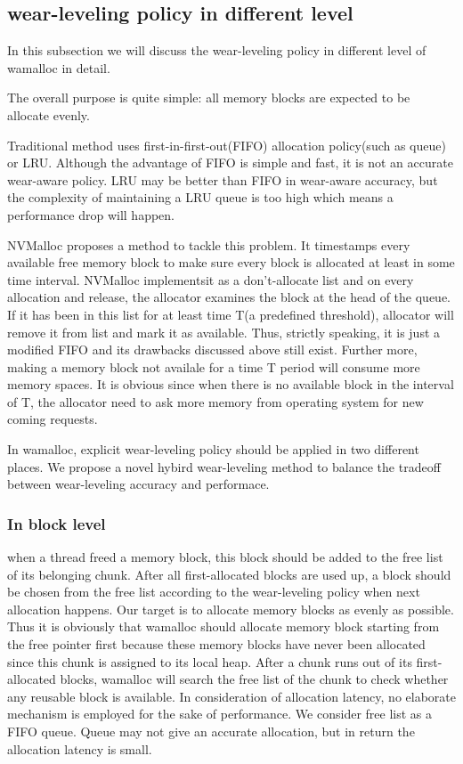 \documentclass{vldb}
\begin{document}
\subsection{wear-leveling policy in different level}

In this subsection we will discuss the wear-leveling policy in different level of wamalloc in detail.

The overall purpose is quite simple: all memory blocks are expected to be allocate evenly.

Traditional method uses first-in-first-out(FIFO) allocation policy(such as queue) or LRU\cite{zhou2009durable}\cite{rodriguez2015write}.
Although the advantage of FIFO is simple and fast, it is not an accurate wear-aware policy.
LRU may be better than FIFO in wear-aware accuracy, but the complexity of maintaining a LRU queue is too high which means a performance drop will happen.

NVMalloc\cite{moraru2013consistent} proposes a method to tackle this problem.
It timestamps every available free memory block to make sure every block is allocated at least in some time interval. NVMalloc implementsit as a don't-allocate list and on every allocation and release, the allocator examines the block at the head of the queue.
If it has been in this list for at least time T(a predefined threshold), allocator will remove it from list and mark it as available.
Thus, strictly speaking, it is just a modified FIFO and its drawbacks discussed above still exist.
Further more, making a memory block not availale for a time T period will consume more memory spaces. It is obvious since when there is no available block in the interval of T, the allocator need to ask more memory from operating system for new coming requests.

In wamalloc, explicit wear-leveling policy should be applied in two different places. 
We propose a novel hybird wear-leveling method to balance the tradeoff between wear-leveling accuracy and performace.

\subsubsection{In block level}
when a thread freed a memory block, this block should be added to the free list of its belonging chunk.
After all first-allocated blocks are used up, a block should be chosen from the free list according to the wear-leveling policy when next allocation happens.
Our target is to allocate memory blocks as evenly as possible.
Thus it is obviously that wamalloc should allocate memory block starting from the free pointer first
because these memory blocks have never been allocated since this chunk is assigned to its local heap.
After a chunk runs out of its first-allocated blocks, wamalloc will search the free list of the chunk to check whether any reusable block is available.
In consideration of allocation latency, no elaborate mechanism is employed for the sake of performance.
We consider free list as a FIFO queue. Queue may not give an accurate allocation, but in return the allocation latency is small.
\end{document}
